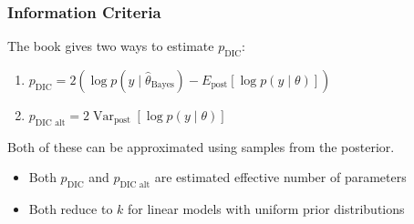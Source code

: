 \documentclass{beamer}
\begin{document}
\begin{frame}
\frametitle{Information Criteria}

The book gives two ways to estimate $p_{\text{DIC}}$:

\begin{enumerate}
\item $p_{\text{DIC}} = 2\left(\log p(y \mid \hat{\theta}_{\text{Bayes}}) - E_{\text{post}}\left[ \log p(y \mid \theta) \right] \right)$
\item $p_{\text{DIC alt}} = 2 \operatorname{Var}_{\text{post}}\left[ \log p(y \mid \theta) \right]$
\end{enumerate}

Both of these can be approximated using samples from the posterior.

\begin{itemize}
\item Both $p_{\text{DIC}}$ and $p_{\text{DIC alt}}$ are estimated
  effective number of parameters
\item Both reduce to $k$ for linear models with uniform prior distributions
\end{itemize}
\end{frame}



\end{document}
